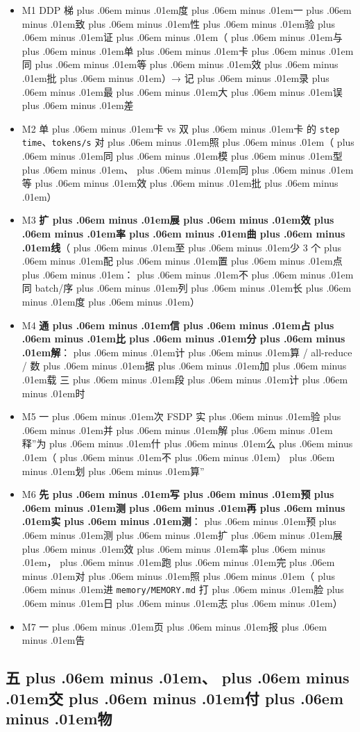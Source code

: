 \documentclass[
]{article}
\newcommand{\passthrough}[1]{#1}
\providecommand{\tightlist}{%
  \setlength{\itemsep}{0pt}\setlength{\parskip}{0pt}}
\def\zh#1{{\zhfont #1}}
\def\sym#1{{\symfont #1}}
\def\zhglue{\hskip0pt plus .06em minus .01em}
\begin{document}
\begin{itemize}
\tightlist
\item[$\square$]
  M1 DDP \zh{梯\zhglue 度\zhglue 一\zhglue 致\zhglue 性\zhglue 验\zhglue 证\zhglue （\zhglue 与\zhglue 单\zhglue 卡\zhglue 同\zhglue 等\zhglue 效\zhglue 批\zhglue ）}\sym{→} \zh{记\zhglue 录\zhglue 最\zhglue 大\zhglue 误\zhglue 差}
\item[$\square$]
  M2 \zh{单\zhglue 卡} vs \zh{双\zhglue 卡} \zh{的} \passthrough{\lstinline!step time!}\zh{、}\passthrough{\lstinline!tokens/s!} \zh{对\zhglue 照\zhglue （\zhglue 同\zhglue 模\zhglue 型\zhglue 、\zhglue 同\zhglue 等\zhglue 效\zhglue 批\zhglue ）}
\item[$\square$]
  M3 \textbf{\zh{扩\zhglue 展\zhglue 效\zhglue 率\zhglue 曲\zhglue 线}}\zh{（\zhglue 至\zhglue 少} 3 \zh{个\zhglue 配\zhglue 置\zhglue 点\zhglue ：\zhglue 不\zhglue 同} batch/\zh{序\zhglue 列\zhglue 长\zhglue 度\zhglue ）}
\item[$\square$]
  M4 \textbf{\zh{通\zhglue 信\zhglue 占\zhglue 比\zhglue 分\zhglue 解}}\zh{：\zhglue 计\zhglue 算} / all-reduce / \zh{数\zhglue 据\zhglue 加\zhglue 载} \zh{三\zhglue 段\zhglue 计\zhglue 时}
\item[$\square$]
  M5 \zh{一\zhglue 次} FSDP \zh{实\zhglue 验\zhglue 并\zhglue 解\zhglue 释}''\zh{为\zhglue 什\zhglue 么\zhglue （\zhglue 不\zhglue ）\zhglue 划\zhglue 算}''
\item[$\square$]
  M6 \textbf{\zh{先\zhglue 写\zhglue 预\zhglue 测\zhglue 再\zhglue 实\zhglue 测}}\zh{：\zhglue 预\zhglue 测\zhglue 扩\zhglue 展\zhglue 效\zhglue 率\zhglue ，\zhglue 跑\zhglue 完\zhglue 对\zhglue 照\zhglue （\zhglue 进} \passthrough{\lstinline!memory/MEMORY.md!} \zh{打\zhglue 脸\zhglue 日\zhglue 志\zhglue ）}
\item[$\square$]
  M7 \zh{一\zhglue 页\zhglue 报\zhglue 告}
\end{itemize}

\subsection{\zh{五\zhglue 、\zhglue 交\zhglue 付\zhglue 物}}\label{ux4e94ux4ea4ux4ed8ux7269-4}
\end{document}
